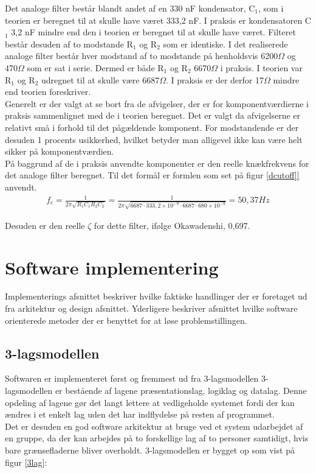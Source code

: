 Det analoge filter består blandt andet af en 330 nF kondensator, C$_1$, som i teorien er beregnet til at skulle have været 333,2 nF. I praksis er kondensatoren C$_1$ 3,2 nF mindre end den i teorien er beregnet til at skulle have været. Filteret består desuden af to modstande R$_1$ og R$_2$ som er identiske. I det realiserede analoge filter består hver modstand af to modstande på henholdsvis 6200$\Omega$ og 470$\Omega$ som er sat i serie. Dermed er både R$_1$ og R$_2$ 6670$\Omega$ i praksis. I teorien var R$_1$ og R$_2$ udregnet til at skulle være 6687$\Omega$. I praksis er der derfor 17$\Omega$ mindre end teorien foreskriver.\\

Generelt er der valgt at se bort fra de afvigelser, der er for komponentværdierne i praksis sammenlignet med de i teorien beregnet. Det er valgt da afvigelserne er relativt små i forhold til det pågældende komponent. For modstandende er der desuden 1 procents usikkerhed, hvilket betyder man alligevel ikke kan være helt sikker på komponentværdien.\\

På baggrund af de i praksis anvendte komponenter er den reelle knækfrekvens for det analoge filter beregnet. Til det formål er formlen som set på figur \ref{dcutoff]} anvendt.\\

\begin{align}
f_{c} = \frac{1}{2\pi \sqrt{R_{1}C_{1}R_{2}C_{2}}} = \frac{1}{2\pi \sqrt{6687 \cdot 333,2\times 10^{-9} \cdot 6687 \cdot 680\times 10^{-9}}} = 50,37 Hz
	\label{dcutoff}
\end{align}

Desuden er den reelle $\zeta$ for dette filter, ifølge Okawadenshi, 0,697.


\section{Software implementering}\label{implementering}
Implementerings afsnittet beskriver hvilke faktiske handlinger der er foretaget ud fra arkitektur og design afsnittet. Yderligere beskriver afsnittet hvilke software orienterede metoder der er benyttet for at løse problemstillingen.

\subsection{3-lagsmodellen}
Softwaren er implementeret først og fremmest ud fra 3-lagsmodellen
3-lagsmodellen er bestående af lagene præsentationslag, logiklag og datalag.
Denne opdeling af lagene gør det langt lettere at vedligeholde systemet fordi der kan ændres i et enkelt lag uden det har indflydelse på resten af programmet. \\
Det er desuden en god software arkitektur at bruge ved et system udarbejdet af en gruppe, da der kan arbejdes på to forskellige lag af to personer samtidigt, hvis bare grænsefladerne bliver overholdt. 3-lagsmodellen er bygget op som vist på figur \ref{3lag}:

